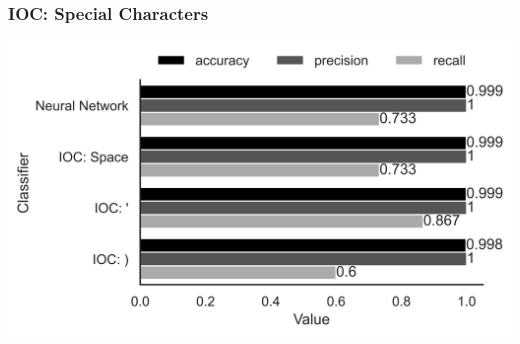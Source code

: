 \begin{frame}
\frametitle{IOC: Special Characters}
\includegraphics[width=\textwidth]{res/performance-special.png}
\end{frame}